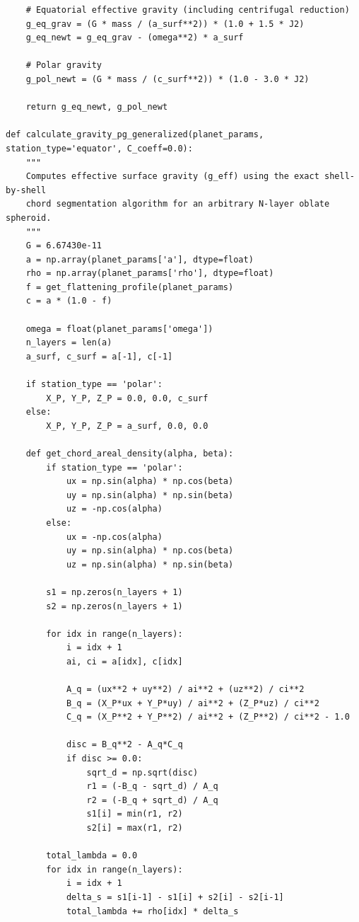 \begin{lstlisting}
    # Equatorial effective gravity (including centrifugal reduction)
    g_eq_grav = (G * mass / (a_surf**2)) * (1.0 + 1.5 * J2)
    g_eq_newt = g_eq_grav - (omega**2) * a_surf
    
    # Polar gravity
    g_pol_newt = (G * mass / (c_surf**2)) * (1.0 - 3.0 * J2)
    
    return g_eq_newt, g_pol_newt

def calculate_gravity_pg_generalized(planet_params, station_type='equator', C_coeff=0.0):
    """
    Computes effective surface gravity (g_eff) using the exact shell-by-shell 
    chord segmentation algorithm for an arbitrary N-layer oblate spheroid.
    """
    G = 6.67430e-11
    a = np.array(planet_params['a'], dtype=float)
    rho = np.array(planet_params['rho'], dtype=float)
    f = get_flattening_profile(planet_params)
    c = a * (1.0 - f)
    
    omega = float(planet_params['omega'])
    n_layers = len(a)
    a_surf, c_surf = a[-1], c[-1]
    
    if station_type == 'polar':
        X_P, Y_P, Z_P = 0.0, 0.0, c_surf
    else:
        X_P, Y_P, Z_P = a_surf, 0.0, 0.0

    def get_chord_areal_density(alpha, beta):
        if station_type == 'polar':
            ux = np.sin(alpha) * np.cos(beta)
            uy = np.sin(alpha) * np.sin(beta)
            uz = -np.cos(alpha)
        else:
            ux = -np.cos(alpha)
            uy = np.sin(alpha) * np.cos(beta)
            uz = np.sin(alpha) * np.sin(beta)
            
        s1 = np.zeros(n_layers + 1)
        s2 = np.zeros(n_layers + 1)
        
        for idx in range(n_layers):
            i = idx + 1
            ai, ci = a[idx], c[idx]
            
            A_q = (ux**2 + uy**2) / ai**2 + (uz**2) / ci**2
            B_q = (X_P*ux + Y_P*uy) / ai**2 + (Z_P*uz) / ci**2
            C_q = (X_P**2 + Y_P**2) / ai**2 + (Z_P**2) / ci**2 - 1.0
            
            disc = B_q**2 - A_q*C_q
            if disc >= 0.0:
                sqrt_d = np.sqrt(disc)
                r1 = (-B_q - sqrt_d) / A_q
                r2 = (-B_q + sqrt_d) / A_q
                s1[i] = min(r1, r2)
                s2[i] = max(r1, r2)
                
        total_lambda = 0.0
        for idx in range(n_layers):
            i = idx + 1
            delta_s = s1[i-1] - s1[i] + s2[i] - s2[i-1]
            total_lambda += rho[idx] * delta_s
            

\end{lstlisting}
